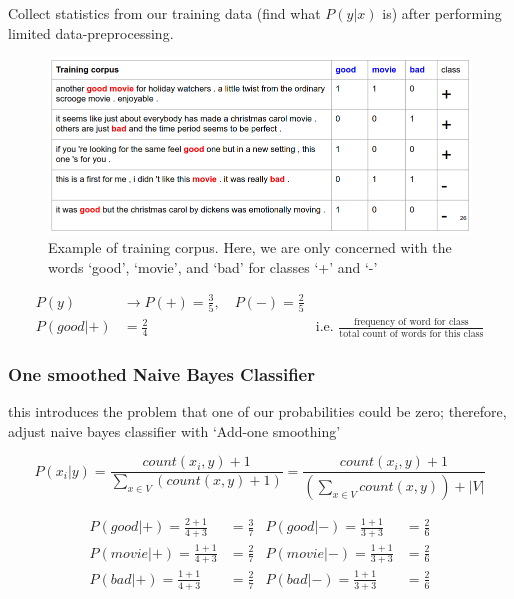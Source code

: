 \documentclass[11pt]{article}
\begin{document}
Collect statistics from our training data (find what $P(y|x)$ is) after performing limited data-preprocessing.

\begin{figure}[H]
    \centering
    \includegraphics*[width=\linewidth]{figures/example.png}
    \caption{Example of training corpus. Here, we are only concerned with the words `good', `movie', and `bad' for classes `+' and `-'}
\end{figure}

\begin{align*}
    P(y) & \rightarrow P(+) = \frac 3 5, \quad P(-) = \frac 2 5 \\ 
    P(good|+) & = \frac 2 4 & \text{i.e. } \frac{\text{frequency of word for class}}{\text{total count of words for this class}}
\end{align*}

\subsubsection{One smoothed Naive Bayes Classifier}

this introduces the problem that one of our probabilities could be zero; therefore, adjust naive bayes classifier with `Add-one smoothing'

\begin{definition}\label{eq:add-one-smoothing}
    \begin{equation*}
        P(x_i|y) = \frac{count(x_i,y)+1}{\sum_{x\in V}(count(x,y)+1)} = \frac{count(x_i, y) + 1}{(\sum_{x\in V} count(x,y)) + |V|}
    \end{equation*}
\end{definition}

\begin{align*}
    P(good|+) = \frac {2 + 1} {4 + 3} & = \frac 3 7 & P(good|-) = \frac{1 + 1}{3 + 3} & = \frac 2 6 \\
    P(movie|+) = \frac{1 + 1}{4 + 3} & = \frac 2 7  & P(movie|-) = \frac{1 + 1}{3 + 3} & = \frac 2 6  \\
    P(bad|+) = \frac{1 + 1}{4 + 3} & = \frac 2 7  & P(bad|-) = \frac{1 + 1}{3 + 3} & = \frac 2 6
\end{align*} 
\end{document}
